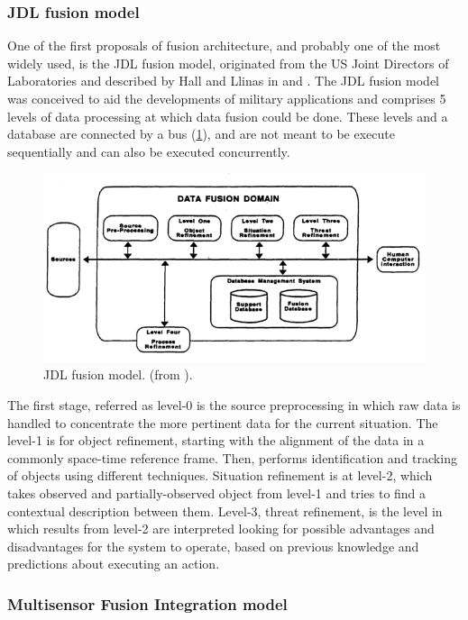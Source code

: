 \subsubsection{JDL fusion model}

One of the first proposals of fusion architecture, and probably one of the most widely used, is the JDL fusion model, originated from the US Joint Directors of Laboratories and described by Hall and Llinas in \cite{Hall1997} and \cite{Llinas1998}. The JDL fusion model was conceived to aid the developments of military applications and comprises 5 levels of data processing at which data fusion could be done. These levels and a database are connected by a bus (\ref{JDLmodel}), and are not meant to be execute sequentially and can also be executed concurrently. 

\begin{figure}[ht!]
\centering
\includegraphics[scale=0.4]{fig/2/jdlmodel.png}
\caption{JDL fusion model. (from \cite{Hall1997}).}
\label{JDLmodel}
\end{figure}

The first stage, referred as level-0 is the source preprocessing in which raw data is handled to concentrate the more pertinent data for the current situation. The level-1 is for object refinement, starting with the alignment of the data in a commonly space-time reference frame. Then, performs identification and tracking of objects using different techniques. Situation refinement is at level-2, which takes observed and partially-observed object from level-1 and tries to find a contextual description between them. Level-3, threat refinement, is the level in which results from level-2 are interpreted looking for possible advantages and disadvantages for the system to operate, based on previous knowledge and predictions about executing an action.

\subsubsection{Multisensor Fusion Integration model}

